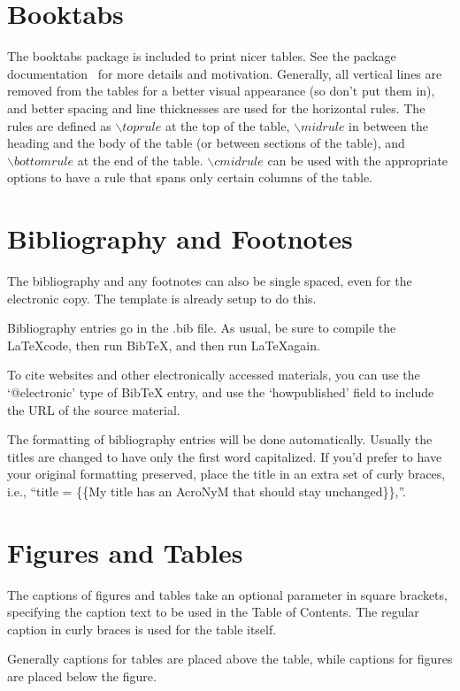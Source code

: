 \section{Booktabs}
The booktabs package is included to print nicer tables. See the package documentation~\cite{fear2005booktabs} for more details and motivation. Generally, all vertical lines are removed from the tables for a better visual appearance (so don't put them in), and better spacing and line thicknesses are used for the horizontal rules. The rules are defined as $\backslash toprule$ at the top of the table, $\backslash midrule$ in between the heading and the body of the table (or between sections of the table), and $\backslash bottomrule$ at the end of the table. $\backslash cmidrule$ can be used with the appropriate options to have a rule that spans only certain columns of the table.

\section{Bibliography and Footnotes}

The bibliography and any footnotes can also be single spaced, even for the electronic copy. The template is already setup to do this.

Bibliography entries go in the .bib file. As usual, be sure to compile the \LaTeX code, then run BibTeX, and then run \LaTeX again.

To cite websites and other electronically accessed materials, you can use the `@electronic' type of BibTeX entry, and use the `howpublished' field to include the URL of the source material.

The formatting of bibliography entries will be done automatically. Usually the titles are changed to have only the first word capitalized. If you'd prefer to have your original formatting preserved, place the title in an extra set of curly braces, i.e., ``title = \{\{My title has an AcroNyM that should stay unchanged\}\},''.

\section{Figures and Tables}
The captions of figures and tables take an optional parameter in square brackets, specifying the caption text to be used in the Table of Contents. The regular caption in curly braces is used for the table itself.

Generally captions for tables are placed above the table, while captions for figures are placed below the figure.



